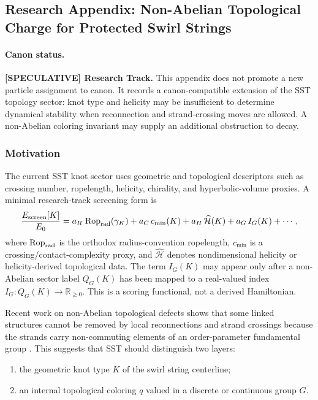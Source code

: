 \subsection{Research Appendix: Non-Abelian Topological Charge for Protected Swirl Strings}
\label{app:nonabelian_topological_charge}

\paragraph{Canon status.}
\textbf{[SPECULATIVE] Research Track.}
This appendix does not promote a new particle assignment to canon. It records a canon-compatible extension of the SST topology sector: knot type and helicity may be insufficient to determine dynamical stability when reconnection and strand-crossing moves are allowed. A non-Abelian coloring invariant may supply an additional obstruction to decay.

\subsubsection{Motivation}
The current SST knot sector uses geometric and topological descriptors such as crossing number, ropelength, helicity, chirality, and hyperbolic-volume proxies. A minimal research-track screening form is
\begin{equation}
    \frac{E_{\rm screen}[K]}{E_0}
    =
    a_R\,\operatorname{Rop}_{\rm rad}(\gamma_K)
    +a_C\,c_{\min}(K)
    +a_H\,\widehat{\mathcal H}(K)
    +a_G\,I_G(K)
    +\cdots,
    \label{eq:sst_screen_energy_research_track}
\end{equation}
where $\operatorname{Rop}_{\rm rad}$ is the orthodox radius-convention ropelength,
$c_{\min}$ is a crossing/contact-complexity proxy, and $\widehat{\mathcal H}$
denotes nondimensional helicity or helicity-derived topological data.  The term
$I_G(K)$ may appear only after a non-Abelian sector label $Q_G(K)$ has been
mapped to a real-valued index $I_G:Q_G(K)\to\mathbb R_{\ge0}$.  This is a
scoring functional, not a derived Hamiltonian.

Recent work on non-Abelian topological defects shows that some linked structures cannot be removed by local reconnections and strand crossings because the strands carry non-commuting elements of an order-parameter fundamental group \cite{Annala2022ProtectedVortexKnots}. This suggests that SST should distinguish two layers:
\begin{enumerate}
    \item the geometric knot type $K$ of the swirl string centerline;
    \item an internal topological coloring $q$ valued in a discrete or continuous group $G$.
\end{enumerate}

